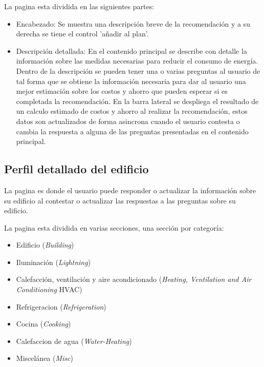 La pagina esta dividida en las siguientes partes:
\begin{itemize}
\item Encabezado: Se muestra una descripción breve de la recomendación y a su
  derecha se tiene el control 'añadir al plan'.
\item Descripción detallada: En el contenido principal se describe con detalle
  la información sobre las medidas necesarias para reducir el consumo de energía.
  Dentro de la descripción se pueden tener una o varias preguntas al usuario
  de tal forma que se obtiene la información necesaria para dar al usuario
  una mejor estimación sobre los costos y ahorro que pueden esperar si es
  completada la recomendación.
  En la barra lateral se despliega el resultado de un calculo estimado
  de costos y ahorro al realizar la recomendación, estos datos son
  actualizados de forma asincrona cuando el usuario contesta o cambia
  la respuesta a alguna de las preguntas presentadas en el contenido
  principal.
\end{itemize}

\subsection{Perfil detallado del edificio}

La pagina  es donde el usuario
puede responder o actualizar la información sobre su edificio al contestar
o actualizar las respuestas a las preguntas sobre su edificio.

La pagina esta dividida en varias secciones, una sección por categoría:
\begin{itemize}
\item Edificio (\textit{Building})
\item Iluminación (\textit{Lightning})
\item Calefacción, ventilación y aire acondicionado (\textit{Heating, Ventilation and Air Conditioning} HVAC)
\item Refrigeracion (\textit{Refrigeration})
\item Cocina (\textit{Cooking})
\item Calefaccion de agua (\textit{Water-Heating})
\item Miscelánea (\textit{Misc})
\end{itemize}

